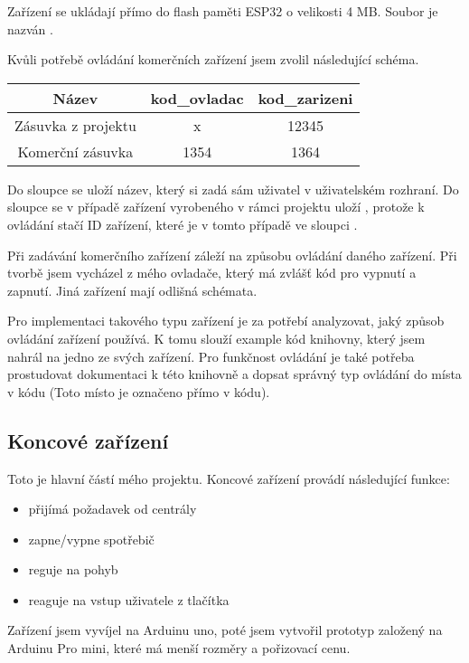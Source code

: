 \documentclass[a4paper,titlepage]{article}
\begin{document}
{Zařízení se ukládají přímo do flash paměti ESP32 o velikosti 4 MB. Soubor je nazván .

Kvůli potřebě ovládání komerčních zařízení jsem zvolil následující schéma. 


\begin{tabular}{|c|c|c|}
	\hline
	Název & kod\_ovladac & kod\_zarizeni \\
	\hline
	Zásuvka z projektu & x & 12345 \\
	\hline
	Komerční zásuvka & 1354 & 1364 \\
	\hline
\end{tabular}


Do sloupce  se uloží název, který si zadá sám uživatel v uživatelském rozhraní. Do sloupce  se v případě zařízení vyrobeného v rámci projektu uloží , protože k ovládání stačí ID zařízení, které je v tomto případě ve sloupci .


Při zadávání komerčního zařízení záleží na způsobu ovládání daného zařízení. Při tvorbě jsem vycházel z mého ovladače, který má zvlášť kód pro vypnutí a zapnutí. Jiná zařízení mají odlišná schémata. 


Pro implementaci takového typu zařízení je za potřebí analyzovat, jaký způsob ovládání zařízení používá. K tomu slouží example kód knihovny, který jsem nahrál na jedno ze svých zařízení. Pro funkčnost ovládání je také potřeba prostudovat dokumentaci k této knihovně a dopsat správný typ ovládání do místa v kódu (Toto místo je označeno přímo v kódu).

\subsection{Koncové zařízení}

Toto je hlavní částí mého projektu. Koncové zařízení provádí následující funkce:

\begin{itemize}
	\item přijímá požadavek od centrály
	\item zapne/vypne spotřebič
	\item reguje na pohyb
	\item reaguje na vstup uživatele z tlačítka
\end{itemize}

Zařízení jsem vyvíjel na Arduinu uno, poté jsem vytvořil prototyp založený na Arduinu Pro mini, které má menší rozměry a pořizovací cenu.

}
\end{document}
